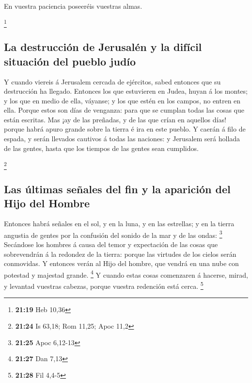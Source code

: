  En vuestra paciencia poseeréis vuestras almas.

\footnote{\textbf{21:19} Heb 10,36}

\hypertarget{la-destrucciuxf3n-de-jerusaluxe9n-y-la-difuxedcil-situaciuxf3n-del-pueblo-juduxedo}{%
\subsection{La destrucción de Jerusalén y la difícil situación del
pueblo
judío}\label{la-destrucciuxf3n-de-jerusaluxe9n-y-la-difuxedcil-situaciuxf3n-del-pueblo-juduxedo}}

 Y cuando viereis á Jerusalem cercada de ejércitos, sabed
entonces que su destrucción ha llegado.  Entonces los que
estuvieren en Judea, huyan á los montes; y los que en medio de ella,
váyanse; y los que estén en los campos, no entren en ella.
 Porque estos son días de venganza: para que se cumplan
todas las cosas que están escritas.  Mas ¡ay de las
preñadas, y de las que crían en aquellos días! porque habrá apuro grande
sobre la tierra é ira en este pueblo.  Y caerán á filo de
espada, y serán llevados cautivos á todas las naciones: y Jerusalem será
hollada de las gentes, hasta que los tiempos de las gentes sean
cumplidos.

\footnote{\textbf{21:24} Is 63,18; Rom 11,25; Apoc 11,2}

\hypertarget{las-uxfaltimas-seuxf1ales-del-fin-y-la-apariciuxf3n-del-hijo-del-hombre}{%
\subsection{Las últimas señales del fin y la aparición del Hijo del
Hombre}\label{las-uxfaltimas-seuxf1ales-del-fin-y-la-apariciuxf3n-del-hijo-del-hombre}}

 Entonces habrá señales en el sol, y en la luna, y en las
estrellas; y en la tierra angustia de gentes por la confusión del sonido
de la mar y de las ondas: \footnote{\textbf{21:25} Apoc 6,12-13}
 Secándose los hombres á causa del temor y expectación de
las cosas que sobrevendrán á la redondez de la tierra: porque las
virtudes de los cielos serán conmovidas.  Y entonces
verán al Hijo del hombre, que vendrá en una nube con potestad y majestad
grande. \footnote{\textbf{21:27} Dan 7,13}  Y cuando
estas cosas comenzaren á hacerse, mirad, y levantad vuestras cabezas,
porque vuestra redención está cerca. \footnote{\textbf{21:28} Fil 4,4-5}

